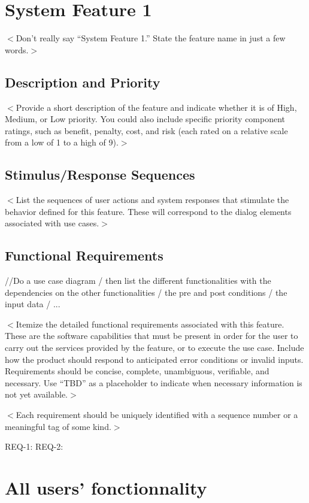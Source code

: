 \documentclass{report}
\begin{document}
\section{System Feature 1}
$<$Don’t really say “System Feature 1.” State the feature name in just a few
words.$>$

\subsection{Description and Priority}
$<$Provide a short description of the feature and indicate whether it is of
High, Medium, or Low priority. You could also include specific priority
component ratings, such as benefit, penalty, cost, and risk (each rated on a
relative scale from a low of 1 to a high of 9).$>$

\subsection{Stimulus/Response Sequences}
$<$List the sequences of user actions and system responses that stimulate the
behavior defined for this feature. These will correspond to the dialog elements
associated with use cases.$>$

\subsection{Functional Requirements}
//Do a use case diagram / then list the different functionalities with the
dependencies on the other functionalities / the pre and post conditions / the input data / ...

$<$Itemize the detailed functional requirements associated with this feature.
These are the software capabilities that must be present in order for the user
to carry out the services provided by the feature, or to execute the use case.
Include how the product should respond to anticipated error conditions or
invalid inputs. Requirements should be concise, complete, unambiguous,
verifiable, and necessary. Use “TBD” as a placeholder to indicate when necessary
information is not yet available.$>$

$<$Each requirement should be uniquely identified with a sequence number or a
meaningful tag of some kind.$>$

REQ-1:	REQ-2:

\section{All users' fonctionnality}
\end{document}
